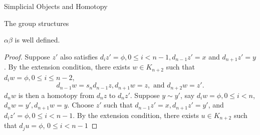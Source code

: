\documentclass[a4,20pt,twosides]{book}
\begin{document}
\begin{chapter}{Simplicial Objects and Homotopy}
\begin{section}{The group structures}
	\begin{chlemma}
		$\alpha \beta$ is well defined.
	\end{chlemma}
	\begin{proof}
		Suppose $z'$ also  satisfies $d_i z' = \phi , 0 \leq i < n-1, d_{n-1} z' = x$ and $d_{n+1} z' =y$. By the extension condition, there exists $w \in  K_{n+2}$ such that $d_i w = \phi, 0 \leq i \leq n-2$,
		\[
		d_{n-1} w = s_n d_{n-1} z, d_{n+1} w = z,\text{ and } d_{n+2} w = z'.
		\]
		$d_n w$ is then a homotopy from $d_n z$ to $d_n z'$. Suppose $y \sim y'$, say $d_i w = \phi, 0 \leq i < n$, $d_n w = y', d_{n+1} w = y$. Choose $z'$ such that $d_{n-1} z' =x, d_{n+1}z' = y'$, and $d_i z' =\phi, 0 \leq i < n-1$. By the extension condition, there exists $u \in K_{n+2}$ such that $d_j u = \phi$, $0 \leq i < n-1$
	\end{proof}
\end{section}
\end{chapter}
\end{document}
